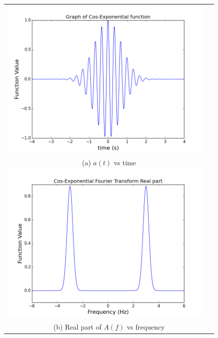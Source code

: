 \documentclass[11pt]{article}
\begin{document}
\begin{figure}[ht]
\centering
\begin{tabular}{cc}
\includegraphics[scale=.4]{cos_wavepacket.png} \\
\multicolumn{2}{c}{(a) $a(t)$ vs time} \\[6pt]

\includegraphics[scale=.4]{cos_fourReal.png}\\
\multicolumn{2}{c}{(b) Real part of $A(f)$ vs frequency} \\[6pt]


\end{tabular}
\end{figure}
\end{document}
